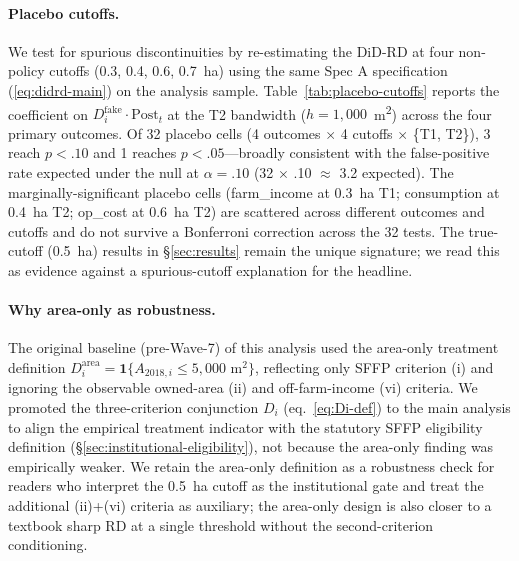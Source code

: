 \documentclass[12pt, a4paper]{article}
\begin{document}
\paragraph{Placebo cutoffs.}\label{sec:robustness-placebo} We test for spurious discontinuities by re-estimating the DiD-RD at four non-policy cutoffs (0.3, 0.4, 0.6, 0.7~ha) using the same Spec A specification (\ref{eq:didrd-main}) on the analysis sample. Table~\ref{tab:placebo-cutoffs} reports the coefficient on $D^{\text{fake}}_i \cdot \text{Post}_t$ at the T2 bandwidth ($h = 1{,}000$~m\textsuperscript{2}) across the four primary outcomes. Of 32 placebo cells (4 outcomes $\times$ 4 cutoffs $\times$ \{T1, T2\}), 3 reach $p < .10$ and 1 reaches $p < .05$---broadly consistent with the false-positive rate expected under the null at $\alpha = .10$ (32 $\times$ .10 $\approx$ 3.2 expected). The marginally-significant placebo cells (farm\_income at 0.3~ha T1; consumption at 0.4~ha T2; op\_cost at 0.6~ha T2) are scattered across different outcomes and cutoffs and do not survive a Bonferroni correction across the 32 tests. The true-cutoff (0.5~ha) results in \S\ref{sec:results} remain the unique signature; we read this as evidence against a spurious-cutoff explanation for the headline.



\paragraph{Why area-only as robustness.}\label{sec:robustness-areaonly} The original baseline (pre-Wave-7) of this analysis used the area-only treatment definition $D^{\text{area}}_i = \mathbf{1}\{A_{2018,i} \le 5{,}000 \text{ m}^2\}$, reflecting only SFFP criterion (i) and ignoring the observable owned-area (ii) and off-farm-income (vi) criteria. We promoted the three-criterion conjunction $D_i$ (eq.~\ref{eq:Di-def}) to the main analysis to align the empirical treatment indicator with the statutory SFFP eligibility definition (\S\ref{sec:institutional-eligibility}), not because the area-only finding was empirically weaker. We retain the area-only definition as a robustness check for readers who interpret the 0.5~ha cutoff as the institutional gate and treat the additional (ii)+(vi) criteria as auxiliary; the area-only design is also closer to a textbook sharp RD at a single threshold without the second-criterion conditioning.
\end{document}
